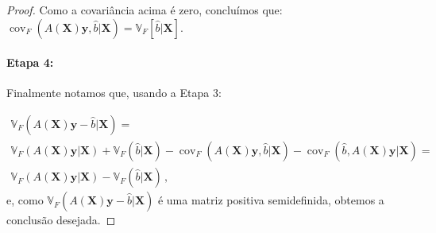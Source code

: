 \documentclass[12pt,a4paper]{article}
\begin{document}
\begin{proof}
Como a covariância acima é zero, concluímos que: $\operatorname{cov}_F(A(\boldsymbol{X})\boldsymbol{y},\hat{b}|\boldsymbol{X})=\mathbb{V}_F[\hat{b}|\boldsymbol{X}]$.
\paragraph{Etapa 4:} Finalmente notamos que, usando a Etapa 3:

\begin{equation*}
\begin{aligned}\mathbb{V}_F(A(\boldsymbol{X})\boldsymbol{y} -\hat{b}|\boldsymbol{X} ) =\\ \mathbb{V}_F(A(\boldsymbol{X})\boldsymbol{y}|\boldsymbol{X} ) +\mathbb{V}_F(\hat{b}|\boldsymbol{X} ) -\operatorname{cov}_F(A(\boldsymbol{X})\boldsymbol{y},\hat{b}|\boldsymbol{X}) - \operatorname{cov}_F(\hat{b},A(\boldsymbol{X})\boldsymbol{y}|\boldsymbol{X}) =\\  \mathbb{V}_F(A(\boldsymbol{X})\boldsymbol{y}|\boldsymbol{X} )-\mathbb{V}_F(\hat{b}|\boldsymbol{X} )\, ,\end{aligned}
\end{equation*}
e, como $\mathbb{V}_F(A(\boldsymbol{X})\boldsymbol{y} -\hat{b}|\boldsymbol{X} ) $ é uma matriz positiva semidefinida, obtemos a conclusão desejada.
\end{proof}
\end{document}
